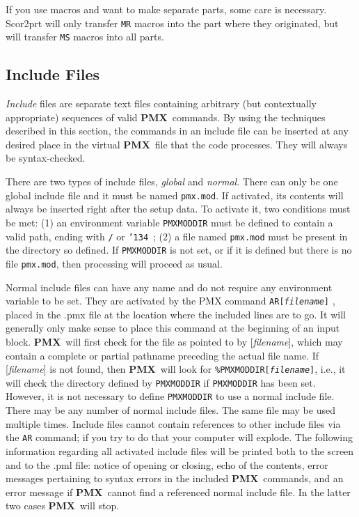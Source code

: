 \documentclass[11pt]{article}
\def\bs{{\tt\char'134}}
\newcommand\PMXX{\textbf{PMX}}
\newcommand\PMX{\PMXX~}
\def\newfrom{2.59}  %
\def\NEW#1{\ifdim#1 pt<\newfrom pt\else%
\marginpar{\fbox{#1}}\fi}
\begin{document}
If you use macros and want to make separate parts, some care is necessary.
{\bfx Scor2prt} will only transfer {\tt MR} macros into the part where they 
originated, but will transfer {\tt MS} macros into all parts.

\subsection{Include Files}\NEW{2.5}\label{ARDirective}
{\it Include} files are separate text files 
    containing arbitrary (but contextually appropriate) sequences of 
    valid \PMX commands. By using the techniques described in this section, 
    the commands in an include file can be inserted at any desired
    place in the virtual \PMX file that the code processes.  
    They will always be syntax-checked. 

There are two types of include files, {\it global} and 
    {\it normal}. There can only be one global include file and it must be named
    {\tt pmx.mod}. If activated, its contents will always be inserted right after 
    the setup data. 
    To activate it, two conditions must be met: (1) an environment variable
    {\tt PMXMODDIR} must be defined to contain a valid path, ending with {\tt /} or 
    \bs~; (2) a file named {\tt pmx.mod} must be present in the directory so defined.
    If {\tt PMXMODDIR} is not set, or if it is defined but there is no file 
    {\tt pmx.mod}, then processing will proceed as usual. 

    Normal include files 
    can have any name and do not require any environment variable to be set. 
    They are activated by the PMX command {\tt AR[{\it filename}]} , placed in the
    .pmx file
    at the location where the included lines are to go. It will generally 
    only make sense to place this command at the beginning of an input block. 
    \PMX will first check 
    for the file as pointed to by [{\it filename}], which may contain a complete 
    or partial pathname preceding the actual file name. If [{\it filename}] is not 
    found, then \PMX will look for {\tt \%PMXMODDIR[{\it filename}]}, i.e., it will check 
    the directory defined by {\tt PMXMODDIR} if {\tt PMXMODDIR} has been set. However, 
    it is not necessary to define {\tt PMXMODDIR} to use a 
    normal include file. There may be any number of normal include files. The same 
    file may be used multiple times. Include files cannot contain references to 
    other include files via the {\tt AR} command; if you try to do that 
    your computer will 
    explode. The following information regarding all activated include 
    files will be printed both to the screen and to the .pml file: notice of 
    opening or closing, echo of the contents, error messages pertaining to syntax 
    errors in the included \PMX commands, and an error message if \PMX cannot find 
    a referenced normal include file. In the latter two cases \PMX will stop. 
\end{document}
